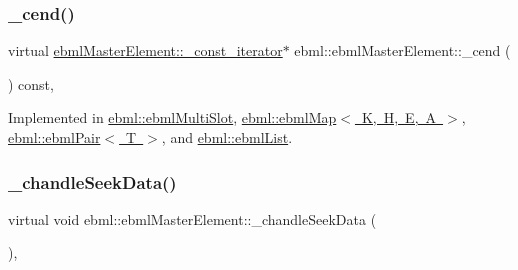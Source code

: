 \subsubsection{\texorpdfstring{\+\_\+cend()}{\_cend()}}
{\footnotesize\ttfamily virtual \mbox{\hyperlink{classebml_1_1ebmlMasterElement_1_1__const__iterator}{ebml\+Master\+Element\+::\+\_\+const\+\_\+iterator}}$\ast$ ebml\+::ebml\+Master\+Element\+::\+\_\+cend (\begin{DoxyParamCaption}{ }\end{DoxyParamCaption}) const\hspace{0.3cm}{\ttfamily [protected]}, {}}



Implemented in \mbox{\hyperlink{classebml_1_1ebmlMultiSlot_a6bc62e4030734829022930e89e94278e}{ebml\+::ebml\+Multi\+Slot}}, \mbox{\hyperlink{classebml_1_1ebmlMap_a2a667c679c5ba26d47d834a42921f988}{ebml\+::ebml\+Map$<$ K, H, E, A $>$}}, \mbox{\hyperlink{classebml_1_1ebmlPair_a555af18316fef979695572e2d0f9a784}{ebml\+::ebml\+Pair$<$ T $>$}}, and \mbox{\hyperlink{classebml_1_1ebmlList_abfda97c7cfa6ab0328b444b7ae832b64}{ebml\+::ebml\+List}}.

\mbox{\label{classebml_1_1ebmlMasterElement_abc2e3886fd267121fdd750dc98f18480}} 
\subsubsection{\texorpdfstring{\+\_\+chandle\+Seek\+Data()}{\_chandleSeekData()}}
{\footnotesize\ttfamily virtual void ebml\+::ebml\+Master\+Element\+::\+\_\+chandle\+Seek\+Data (\begin{DoxyParamCaption}\item[{const \mbox{\hyperlink{classebml_1_1parseFile}{parse\+File}} \&}]{ }\end{DoxyParamCaption})\hspace{0.3cm}{\ttfamily [protected]}, {\ttfamily [virtual]}}

\mbox{\label{classebml_1_1ebmlMasterElement_a2fdf9fa1022f06a046fe94e631e266a3}} 
